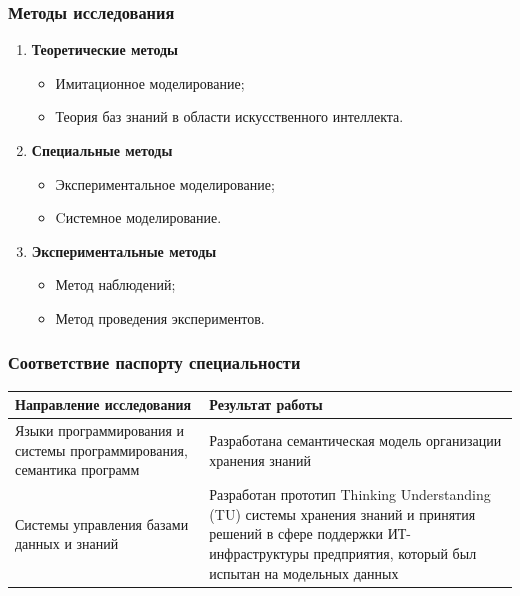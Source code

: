 \documentclass[14pt]{beamer}
\begin{document}
\begin{frame}
\frametitle{Методы исследования}
\begin{enumerate}
  \item \textbf{Теоретические методы}
  \begin{itemize}
    \item Имитационное моделирование;
    \item Теория баз знаний в области искусственного интеллекта.
  \end{itemize}
   \item \textbf{Специальные методы}
  \begin{itemize}
    \item Экспериментальное моделирование;
    \item Cистемное моделирование.
  \end{itemize}
  
   \item \textbf{Экспериментальные методы}
  \begin{itemize}
    \item Метод наблюдений;
    \item Метод проведения экспериментов.
  \end{itemize}

\end{enumerate}
\end{frame}


\begin{frame}
\frametitle{Соответствие паспорту специальности}

\begin{table}
	
\small

\begin{tabular} {|p{5cm}|p{5cm}|}


 \hline
\textbf{Направление исследования} & Результат работы\\

\hline
   Языки программирования и системы программирования, семантика программ & Разработана семантическая модель организации хранения знаний \\
   \hline
  Системы управления базами данных и знаний & Разработан прототип Thinking Understanding (TU) системы хранения знаний и принятия решений в сфере поддержки ИТ-инфраструктуры предприятия, который был испытан на модельных данных\\
   \hline
    \end{tabular}
\end{table}
\end{frame}
\end{document}
